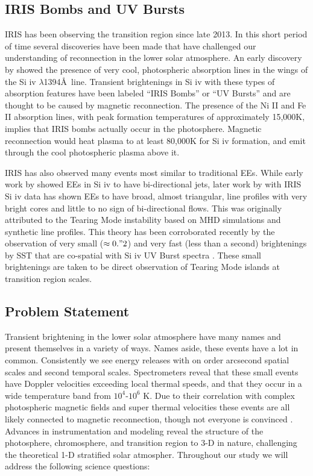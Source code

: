 \documentclass[]{aastex6}
\begin{document}
	\subsection{IRIS Bombs and UV Bursts}
	IRIS has been observing the transition region since late 2013.  In this short period of time several discoveries have been made that have challenged our understanding of reconnection in the lower solar atmosphere.  An early discovery by \citet{Peter2014} showed the presence of very cool, photospheric absorption lines in the wings of the Si {\sc iv} $\lambda$1394\AA\ line. Transient brightenings in Si {\sc iv} with these types of absorption features have been labeled ``IRIS Bombs'' or ``UV Bursts'' and are thought to be caused by magnetic reconnection. The presence of the Ni II and Fe II absorption lines, with peak formation temperatures of approximately 15,000K, implies that IRIS bombs actually occur in the photosphere.  Magnetic reconnection would heat plasma to at least 80,000K for Si {\sc iv} formation, and emit through the cool photospheric plasma above it.
	
	IRIS has also observed many events most similar to traditional EEs.  While early work by \citet{Innes1997} showed EEs in Si {\sc iv} to have bi-directional jets, later work by \citet{Innes2015} with IRIS Si {\sc iv} data has shown EEs to have broad, almost triangular, line profiles with very bright cores and little to no sign of bi-directional flows.  This was originally attributed to the Tearing Mode instability based on MHD simulations and synthetic line profiles. This theory has been corroborated recently by the observation of very small ($\approx 0."2$) and very fast (less than a second) brightenings by SST that are co-spatial with Si {\sc iv} UV Burst spectra \citep{Rouppe2017}.  These small brightenings are taken to be direct observation of Tearing Mode islands at transition region scales.
	
	
	
	\subsection{Problem Statement} 
	Transient brightening in the lower solar atmosphere have many names and present themselves in a variety of ways. Names aside, these events have a lot in common.  Consistently we see energy releases with on order arcsecond spatial scales and second temporal scales. Spectrometers reveal that these small events have Doppler velocities exceeding local thermal speeds, and that they occur in a wide temperature band from $10^4$-$10^6$ K.  Due to their correlation with complex photospheric magnetic fields and super thermal velocities these events are all likely connected to magnetic reconnection, though not everyone is convinced \citep{Judge2015}. Advances in instrumentation and modeling reveal the structure of the photosphere, chromosphere, and transition region to 3-D in nature, challenging the theoretical 1-D stratified solar atmospher.  Throughout our study we will address the following science questions:
	
\end{document}
